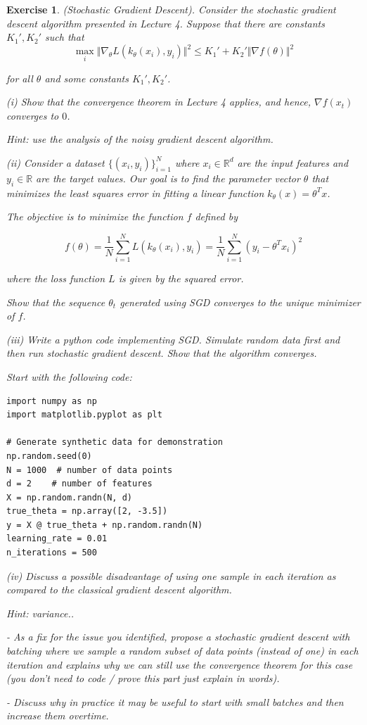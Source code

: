\documentclass[letter,11pt]{article}
\newtheorem{exercise}{Exercise}[section]
\begin{document}
\begin{exercise} (Stochastic Gradient Descent). 
    Consider the stochastic gradient descent algorithm presented in Lecture 4. Suppose that there are constants $K_{1}',K_{2}'$ such  that
\[
\max _{i} \Vert \nabla_\theta L(k_\theta(x_i), y_i) \Vert ^{2} \leq K_{1}' + K_{2}' \Vert \nabla f(\theta) \Vert ^{2}
\]

for all \(\theta\) and some constants \( K_{1}',K_{2}' \).

(i) Show that the convergence theorem in Lecture 4 applies, and hence, $\nabla f(x_{t}) $ converges to $0$. 

Hint: use the analysis of the noisy gradient descent algorithm. 

(ii) Consider a dataset \( \{(x_i, y_i)\}_{i=1}^N \) where \( x_i \in \mathbb{R}^d \) are the input features and \( y_i \in \mathbb{R} \) are the target values. Our goal is to find the parameter vector \( \theta \) that minimizes the least squares error in fitting a linear function \( k_\theta(x) = \theta^T x \).

The objective is to minimize the function \( f \) defined by

\[
f(\theta) = \frac{1}{N} \sum_{i=1}^{N} L(k_\theta(x_{i}), y_i) = \frac{1}{N} \sum_{i=1}^{N} \left( y_i - \theta^T x_i \right)^2 
\]

where the loss function \( L \) is given by the squared error.


Show that the sequence $\theta_{t}$ generated using SGD converges to the unique minimizer of $f$. 



(iii) Write a python code implementing SGD. Simulate random data first and then run stochastic gradient descent. Show that the algorithm converges. 

 Start with the following code: 

\begin{lstlisting}
import numpy as np
import matplotlib.pyplot as plt

# Generate synthetic data for demonstration
np.random.seed(0)
N = 1000  # number of data points
d = 2    # number of features
X = np.random.randn(N, d)
true_theta = np.array([2, -3.5])
y = X @ true_theta + np.random.randn(N) 
learning_rate = 0.01
n_iterations = 500
\end{lstlisting}


(iv) Discuss a possible disadvantage of using one sample in each iteration as compared to the classical gradient descent algorithm. 

Hint: variance..

- As a fix for the issue you identified, propose a stochastic gradient descent with batching where we  sample a random subset of data points (instead of one) in each iteration and explains why we can still use the convergence theorem for this case (you don't need to code / prove this part just explain in words).

- Discuss why in practice it may be useful to start with small batches and then increase them overtime. 

 


\end{exercise}
\end{document}
